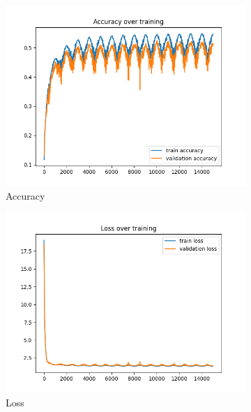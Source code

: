 \documentclass[a4paper]{article}
\begin{document}
\begin{figure}[h]
	\centering
	\begin{subfigure}{0.3\textwidth}
		\centering
		\includegraphics[width=\linewidth]{images/final_acc.png}
		\caption{Accuracy}
	\end{subfigure}
	\begin{subfigure}{0.3\textwidth}
		\centering
		\includegraphics[width=\linewidth]{images/final_loss.png}
		\caption{Loss}
	\end{subfigure}
	\begin{subfigure}{0.3\textwidth}
		\centering

\end{subfigure}
\end{figure}
\end{document}
